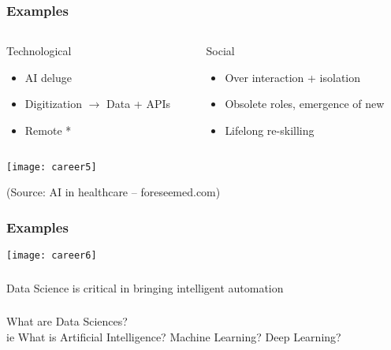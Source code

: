 \begin{frame}[fragile]\frametitle{Examples}
\begin{columns}
    \begin{column}[T]{0.5\linewidth}
			Technological
      \begin{itemize}
			\item AI deluge
			\item Digitization $\rightarrow$ Data + APIs
			\item Remote *
			\end{itemize}
    \end{column}
    \begin{column}[T]{0.5\linewidth}
			Social
      \begin{itemize}
			\item Over interaction + isolation
			\item Obsolete roles, emergence of new
			\item Lifelong re-skilling
			\end{itemize}		
    \end{column}
  \end{columns}
	
	\begin{center}
\texttt{[image: career5]}
\end{center}

{\tiny (Source: AI in healthcare – foreseemed.com)}

\end{frame}

\begin{frame}[fragile]\frametitle{Examples}
	
	\begin{center}
	\texttt{[image: career6]}
	\end{center}

\end{frame}

\begin{frame}[fragile]\frametitle{}
\begin{center}
{\Large Data Science is critical in bringing intelligent automation}
\end{center}
\end{frame}


\begin{frame}[fragile]\frametitle{}
\begin{center}
{\Large What are Data Sciences? \\ \small ie What is Artificial Intelligence? Machine Learning? Deep Learning?}
\end{center}
\end{frame}


